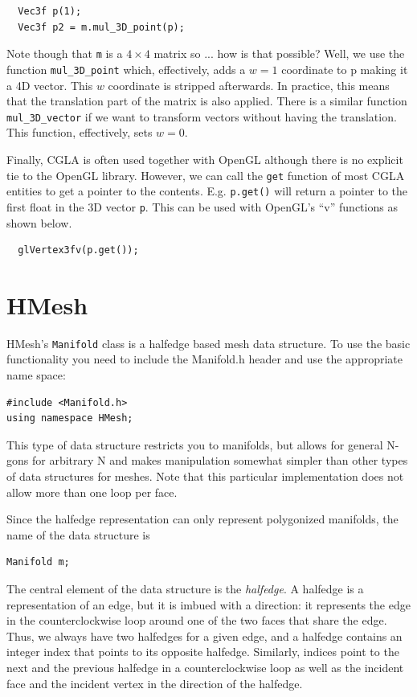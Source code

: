 \documentclass[a4paper]{article}
\begin{document}
\begin{verbatim}
  Vec3f p(1);
  Vec3f p2 = m.mul_3D_point(p);
\end{verbatim}

Note though that \texttt{m} is a $4\times
4$ matrix so ... how is that possible? Well, we use the function
\texttt{mul\_3D\_point} which, effectively, adds a $w=1$ coordinate to p
making it a 4D vector. This $w$ coordinate is stripped afterwards. In
practice, this means that the translation part of the matrix is also
applied. There is a similar function \texttt{mul\_3D\_vector} if we want
to transform vectors without having the translation. This function,
effectively, sets $w=0$.

Finally, CGLA is often used together with OpenGL although there is no
explicit tie to the OpenGL library. However, we can call the
\texttt{get} function of most CGLA entities to get a pointer to the
contents. E.g. \texttt{p.get()} will return a pointer to the first
float in the 3D vector \texttt{p}. This can be used with OpenGL's
``v'' functions as shown below. 

\begin{verbatim}
  glVertex3fv(p.get());
\end{verbatim}
%
%
\section{HMesh}
%
%
HMesh's \texttt{Manifold} class is a halfedge based mesh data structure. To use the basic functionality you need to include the Manifold.h header and use the appropriate name space:
\begin{verbatim}
#include <Manifold.h>
using namespace HMesh;
\end{verbatim}
This type of data structure restricts you to manifolds, but allows for general N-gons for arbitrary N and makes manipulation somewhat simpler than other types of data structures for meshes.  Note that this particular implementation does not allow more than one loop per face. 

Since the halfedge representation can only represent polygonized manifolds, the name of the data structure is
\begin{verbatim}
Manifold m;
\end{verbatim}
The central element of the data structure is the \textit{halfedge}. A halfedge is a representation of an edge, but it is imbued with a direction: it represents the edge in the counterclockwise loop around one of the two faces that share the edge. Thus, we always have two halfedges for a given edge, and a halfedge contains an integer index that points to its opposite halfedge. Similarly, indices point to the next and the previous halfedge in a counterclockwise loop as well as the incident face and the incident vertex in the direction of the halfedge.
\end{document}
